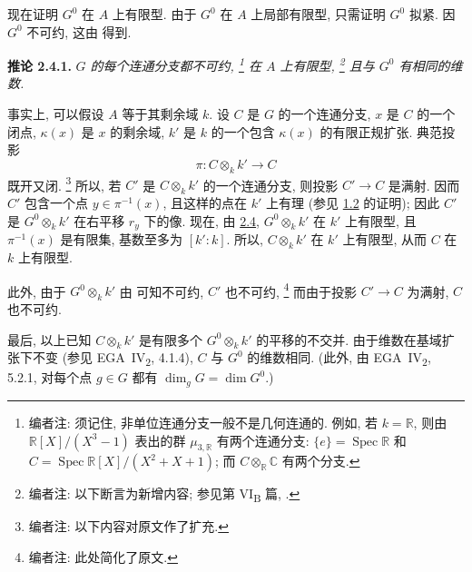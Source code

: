 现在证明 \(G^0\) 在 \(A\) 上有限型.
由于 \(G^0\) 在 \(A\) 上局部有限型, 只需证明 \(G^0\) 拟紧.
因 \(G^0\) 不可约, 这由  得到.

\medskip
{}\label{cor:sga3-VIA-2.4.1}%
\noindent\textbf{推论 2.4.1.}
\textit{\(G\) 的每个连通分支都不可约,%
\footnote{\label{note:sga3-VIA-26}编者注: 须记住,
非单位连通分支一般不是几何连通的.
例如, 若 \(k=\mathbb R\), 则由
\(\mathbb R[X]/(X^3-1)\) 表出的群 \(\mu_{3,\mathbb R}\)
有两个连通分支: \(\{e\}=\operatorname{Spec}\mathbb R\)
和 \(C=\operatorname{Spec}\mathbb R[X]/(X^2+X+1)\);
而 \(C\otimes_{\mathbb R}\mathbb C\) 有两个分支.}
在 \(A\) 上有限型,%
\footnote{\label{note:sga3-VIA-27}编者注: 以下断言为新增内容;
参见第 VI\textsubscript{B} 篇, .}
且与 \(G^0\) 有相同的维数.}

\medskip
事实上, 可以假设 \(A\) 等于其剩余域 \(k\).
设 \(C\) 是 \(G\) 的一个连通分支,
\(x\) 是 \(C\) 的一个闭点,
\(\kappa(x)\) 是 \(x\) 的剩余域,
\(k'\) 是 \(k\) 的一个包含 \(\kappa(x)\) 的有限正规扩张.
典范投影
\[
  \pi:C\otimes_kk'\longrightarrow C
\]
既开又闭.%
\footnote{\label{note:sga3-VIA-28}编者注: 以下内容对原文作了扩充.}
所以, 若 \(C'\) 是 \(C\otimes_kk'\) 的一个连通分支,
则投影 \(C'\to C\) 是满射.
因而 \(C'\) 包含一个点 \(y\in\pi^{-1}(x)\),
且这样的点在 \(k'\) 上有理 (参见 \hyperref[prop:sga3-VIA-1.2]{1.2} 的证明);
因此 \(C'\) 是 \(G^0\otimes_kk'\) 在右平移 \(r_y\) 下的像.
现在, 由 \hyperref[prop:sga3-VIA-2.4]{2.4},
\(G^0\otimes_kk'\) 在 \(k'\) 上有限型,
且 \(\pi^{-1}(x)\) 是有限集, 基数至多为 \([k':k]\).
所以, \(C\otimes_kk'\) 在 \(k'\) 上有限型,
从而 \(C\) 在 \(k\) 上有限型.

此外, 由于 \(G^0\otimes_kk'\) 由  可知不可约,
\(C'\) 也不可约,%
\footnote{\label{note:sga3-VIA-29}编者注: 此处简化了原文.}
而由于投影 \(C'\to C\) 为满射, \(C\) 也不可约.

最后, 以上已知 \(C\otimes_kk'\) 是有限多个
\(G^0\otimes_kk'\) 的平移的不交并.
由于维数在基域扩张下不变
(参见 EGA~IV\textsubscript{2}, 4.1.4),
\(C\) 与 \(G^0\) 的维数相同.
(此外, 由 EGA~IV\textsubscript{2}, 5.2.1,
对每个点 \(g\in G\) 都有 \(\dim_gG=\dim G^0\).)

